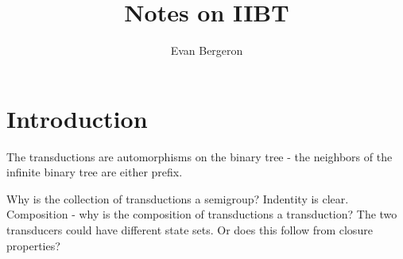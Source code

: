 \documentclass{article}
\title{Notes on IIBT}
\author{Evan Bergeron}
\begin{document}
\maketitle
\section{Introduction}
The transductions are automorphisms on the binary tree - the neighbors of the infinite binary tree are either prefix.

Why is the collection of transductions a semigroup? Indentity is clear. Composition - why is the composition of transductions a transduction? The two transducers could have different state sets. Or does this follow from closure properties?
\end{document}
